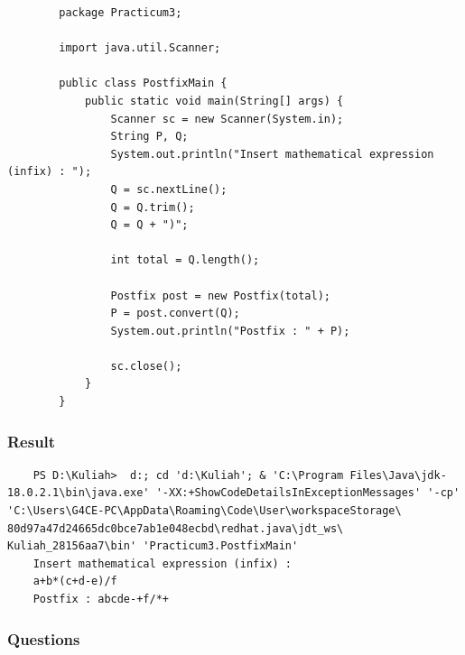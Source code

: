 \documentclass[12pt,titlepage]{article}
\begin{document}
\begin{enumerate}
    \begin{verbatim}
        package Practicum3;

        import java.util.Scanner;

        public class PostfixMain {
            public static void main(String[] args) {
                Scanner sc = new Scanner(System.in);
                String P, Q;
                System.out.println("Insert mathematical expression (infix) : ");
                Q = sc.nextLine();
                Q = Q.trim();
                Q = Q + ")";

                int total = Q.length();

                Postfix post = new Postfix(total);
                P = post.convert(Q);
                System.out.println("Postfix : " + P);

                sc.close();
            }
        }
    \end{verbatim}
\end{enumerate}

\subsubsection{Result}

\begin{verbatim}
    PS D:\Kuliah>  d:; cd 'd:\Kuliah'; & 'C:\Program Files\Java\jdk-18.0.2.1\bin\java.exe' '-XX:+ShowCodeDetailsInExceptionMessages' '-cp' 'C:\Users\G4CE-PC\AppData\Roaming\Code\User\workspaceStorage\ 80d97a47d24665dc0bce7ab1e048ecbd\redhat.java\jdt_ws\ Kuliah_28156aa7\bin' 'Practicum3.PostfixMain' 
    Insert mathematical expression (infix) : 
    a+b*(c+d-e)/f
    Postfix : abcde-+f/*+
\end{verbatim}

\subsubsection{Questions}
\end{document}
